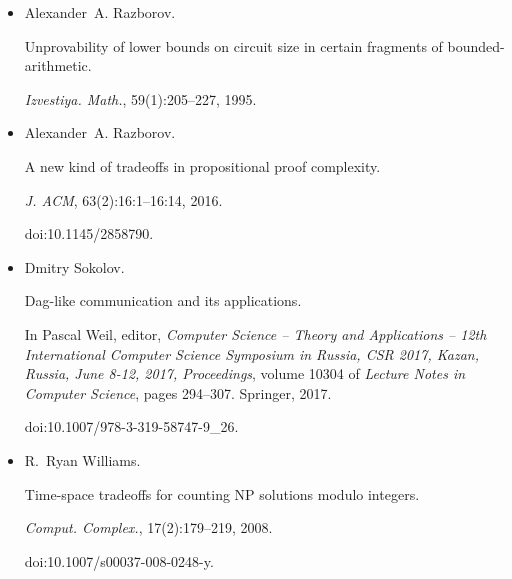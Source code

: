 \begin{itemize}
Pavel Pudlák.


On extracting computations from propositional proofs (a survey).


In Kamal Lodaya and Meena Mahajan, editors, \emph{IARCS Annual
Conference on Foundations of Software Technology and Theoretical Computer
Science, FSTTCS 2010, December 15-18, 2010, Chennai, India}, volume 8 of
\emph{LIPIcs}, pages 30–41. Schloss Dagstuhl – Leibniz-Zentrum für
Informatik, 2010.


doi:10.4230/LIPIcs.FSTTCS.2010.30.





\item[] 
[23]

Alexander A. Razborov.


Unprovability of lower bounds on circuit size in certain fragments of
bounded-arithmetic.


\emph{Izvestiya. Math.}, 59(1):205–227, 1995.





\item[] 
[24]

Alexander A. Razborov.


A new kind of tradeoffs in propositional proof complexity.


\emph{J. ACM}, 63(2):16:1–16:14, 2016.


doi:10.1145/2858790.





\item[] 
[25]

Dmitry Sokolov.


Dag-like communication and its applications.


In Pascal Weil, editor, \emph{Computer Science – Theory and
Applications – 12th International Computer Science Symposium in Russia,
CSR 2017, Kazan, Russia, June 8-12, 2017, Proceedings}, volume 10304 of
\emph{Lecture Notes in Computer Science}, pages 294–307. Springer, 2017.


doi:10.1007/978-3-319-58747-9\_26.





\item[] 
[26]

R. Ryan Williams.


Time-space tradeoffs for counting NP solutions modulo integers.


\emph{Comput. Complex.}, 17(2):179–219, 2008.


doi:10.1007/s00037-008-0248-y.





\end{itemize}





